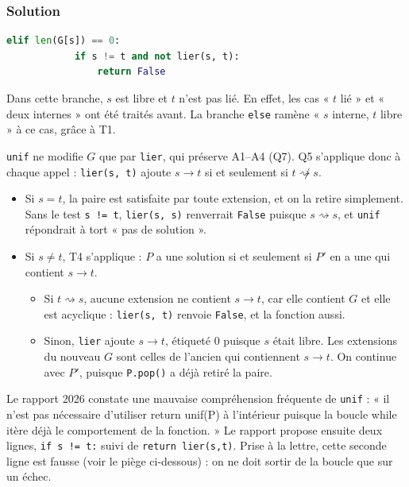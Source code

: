 \documentclass[11pt,a4paper]{article}
\providecommand{\tightlist}{\setlength{\itemsep}{0pt}\setlength{\parskip}{0pt}}
\begin{document}
\hypertarget{solution-13}{%
\subsubsection{Solution}\label{solution-13}}

\begin{lstlisting}[language=Python]
        elif len(G[s]) == 0:
            if s != t and not lier(s, t):
                return False
\end{lstlisting}

Dans cette branche, \(s\) est libre et \(t\) n'est pas lié. En effet, les cas « \(t\) lié » et « deux internes » ont été traités avant. La branche \texttt{else} ramène « \(s\) interne, \(t\) libre » à ce cas, grâce à T1.

\texttt{unif} ne modifie \(G\) que par \texttt{lier}, qui préserve A1--A4 (Q7). Q5 s'applique donc à chaque appel : \texttt{lier(s,\ t)} ajoute \(s\to t\) si et seulement si \(t\not\rightsquigarrow s\).

\begin{itemize}
\tightlist
\item
  Si \(s=t\), la paire est satisfaite par toute extension, et on la retire simplement. Sans le test \texttt{s\ !=\ t}, \texttt{lier(s,\ s)} renverrait \texttt{False} puisque \(s\rightsquigarrow s\), et \texttt{unif} répondrait à tort « pas de solution ».
\item
  Si \(s\neq t\), T4 s'applique : \(P\) a une solution si et seulement si \(P'\) en a une qui contient \(s\to t\).

  \begin{itemize}
  \tightlist
  \item
    Si \(t\rightsquigarrow s\), aucune extension ne contient \(s\to t\), car elle contient \(G\) et elle est acyclique : \texttt{lier(s,\ t)} renvoie \texttt{False}, et la fonction aussi.
  \item
    Sinon, \texttt{lier} ajoute \(s\to t\), étiqueté 0 puisque \(s\) était libre. Les extensions du nouveau \(G\) sont celles de l'ancien qui contiennent \(s\to t\). On continue avec \(P'\), puisque \texttt{P.pop()} a déjà retiré la paire.
  \end{itemize}
\end{itemize}

\begin{jury}

Le rapport 2026 constate une mauvaise compréhension fréquente de \texttt{unif} : « il n'est pas nécessaire d'utiliser return unif(P) à l'intérieur puisque la boucle while itère déjà le comportement de la fonction. » Le rapport propose ensuite deux lignes, \texttt{if\ s\ !=\ t:} suivi de \texttt{return\ lier(s,t)}. Prise à la lettre, cette seconde ligne est fausse (voir le piège ci-dessous) : on ne doit sortir de la boucle que sur un échec.

\end{jury}
\end{document}
